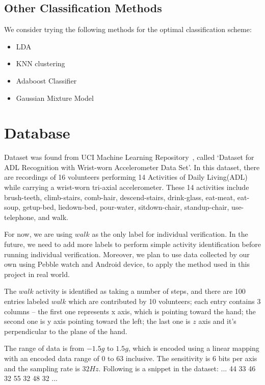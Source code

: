 \documentclass[10pt,twocolumn,letterpaper]{article}
\begin{document}
\subsection{Other Classification Methods}

We consider trying the following methods for the optimal classification scheme:
\begin{itemize}
\item LDA
\item KNN clustering
\item Adaboost Classifier
\item Gaussian Mixture Model

\end{itemize}

\section{Database}

Dataset was found from UCI Machine Learning Repository~\cite{Author02}, called ‘Dataset for ADL Recognition with Wrist-worn Accelerometer Data Set’. In this dataset, there are recordings of 16 volunteers performing 14 Activities of Daily Living(ADL) while carrying a wrist-worn tri-axial accelerometer. These 14 activities include brush-teeth, climb-stairs, comb-hair, descend-stairs, drink-glass, eat-meat, eat-soup, getup-bed, liedown-bed, pour-water, sitdown-chair, standup-chair, use-telephone, and walk.

For now, we are using $walk$ as the only label for individual verification. In the future, we need to add more labels to perform simple activity identification before running individual verification. Moreover, we plan to use data collected by our own using Pebble watch and Android device, to apply the method used in this project in real world.

The $walk$ activity is identified as taking a number of steps, and there are 100 entries labeled $walk$ which are contributed by 10 volunteers; each entry contains 3 columns -- the first one represents x axis, which is pointing toward the hand; the second one is y axis pointing toward the left; the last one is $z$ axis and it’s perpendicular to the plane of the hand.

The range of data is from $-1.5g$ to $1.5g$, which is encoded using a linear mapping with an encoded data range of 0 to 63 inclusive. The sensitivity is 6 bits per axis and the sampling rate is $32Hz$. Following is a snippet in the dataset:\newline
... 44 33 46 32 55 32 48 32\newline
...\newline
\end{document}
